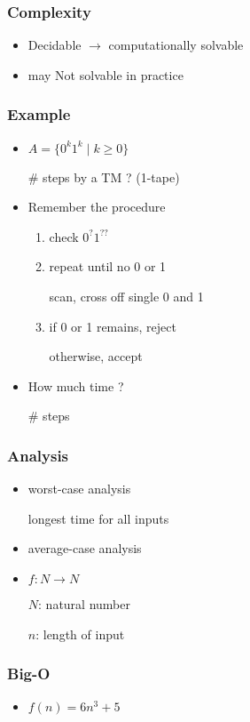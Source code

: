 




\begin{frame}[allowframebreaks] \frametitle{Complexity}
  \begin{itemize}
\item Decidable $\rightarrow$ computationally solvable
\item may Not solvable in practice

\end{itemize}\end{frame} \begin{frame}[allowframebreaks] \frametitle{Example}
  \begin{itemize}
\item $A=\{0^k 1^k\mid k \geq 0\}$

\# steps by a TM ? (1-tape)
\item Remember the procedure
  \begin{enumerate}
  \item check $0^? 1^{??}$
  \item repeat until no 0 or 1

scan, cross off single 0 and 1
\item if 0 or 1 remains, reject

otherwise, accept

  \end{enumerate}
\item How much time ?

\# steps
\end{itemize}\end{frame} \begin{frame}[allowframebreaks] \frametitle{Analysis}
  \begin{itemize}
\item worst-case analysis

longest time for all inputs

\item average-case analysis
\item $f: N \rightarrow N$

$N$: natural number

$n$: length of input

\end{itemize}\end{frame} \begin{frame}[allowframebreaks] \frametitle{Big-O}
  \begin{itemize}
\item $f(n)=6n^3 + 5$


\end{itemize}
\end{frame}

